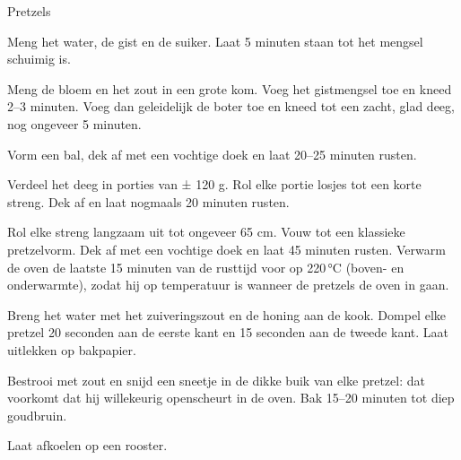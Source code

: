 \begin{recipe}{Pretzels}
\begin{steps}
  \item Meng het water, de gist en de suiker. Laat 5 minuten staan tot het mengsel
        schuimig is.
  \item Meng de bloem en het zout in een grote kom. Voeg het gistmengsel toe en
        kneed 2--3 minuten. Voeg dan geleidelijk de boter toe en kneed tot een zacht,
        glad deeg, nog ongeveer 5 minuten.
  \item Vorm een bal, dek af met een vochtige doek en laat 20--25 minuten rusten.
  \item Verdeel het deeg in porties van ± 120 g. Rol elke portie losjes tot een
        korte streng. Dek af en laat nogmaals 20 minuten rusten.
  \item Rol elke streng langzaam uit tot ongeveer 65 cm. Vouw tot een klassieke
        pretzelvorm. Dek af met een vochtige doek en laat 45 minuten rusten.
        Verwarm de oven de laatste 15 minuten van de rusttijd voor op
        220\,°C (boven- en onderwarmte), zodat hij op temperatuur is
        wanneer de pretzels de oven in gaan.
  \item Breng het water met het zuiveringszout en de
        honing aan de kook. Dompel elke pretzel 20 seconden aan de eerste kant en
        15 seconden aan de tweede kant. Laat uitlekken op bakpapier.
  \item Bestrooi met zout en snijd een sneetje in de dikke buik van elke pretzel:
        dat voorkomt dat hij willekeurig openscheurt in de oven. Bak 15--20
        minuten tot diep goudbruin.
  \item Laat afkoelen op een rooster.
\end{steps}
\end{recipe}

